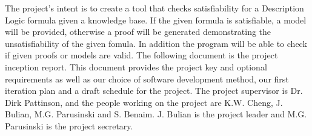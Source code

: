 The project's intent is to create a tool that checks satisfiability for a Description Logic formula given a knowledge base. If the given formula is satisfiable, a model will be provided, otherwise a proof will be generated demonstrating the unsatisfiability of the given fomula. In addition the program will be able to check if given proofs or models are valid.
The following document is the project inception report. This document provides the project key and optional requirements as well as our choice of software development method, our first iteration plan and a draft schedule for the project.
The project supervisor is Dr. Dirk Pattinson, and the people working on the project
are K.W. Cheng, J. Bulian, M.G. Parusinski and S. Benaim. J. Bulian is the project leader and M.G. Parusinski is the project secretary.

